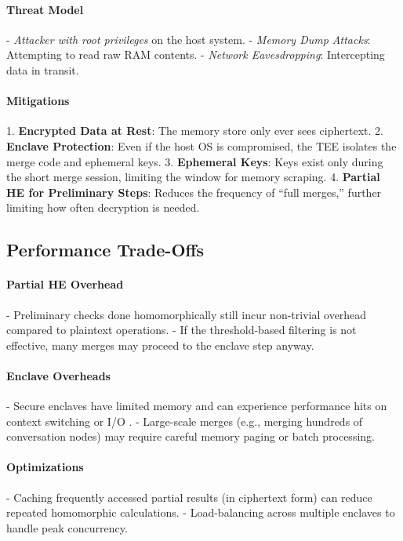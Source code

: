 \documentclass{article}
\begin{document}
\paragraph{Threat Model}
- \emph{Attacker with root privileges} on the host system.
- \emph{Memory Dump Attacks}: Attempting to read raw RAM contents.
- \emph{Network Eavesdropping}: Intercepting data in transit.

\paragraph{Mitigations}
1. \textbf{Encrypted Data at Rest}: The memory store only ever sees ciphertext.  
2. \textbf{Enclave Protection}: Even if the host OS is compromised, the TEE isolates the merge code and ephemeral keys.  
3. \textbf{Ephemeral Keys}: Keys exist only during the short merge session, limiting the window for memory scraping.  
4. \textbf{Partial HE for Preliminary Steps}: Reduces the frequency of “full merges,” further limiting how often decryption is needed.

\subsection{Performance Trade-Offs}

\paragraph{Partial HE Overhead}
- Preliminary checks done homomorphically still incur non-trivial overhead compared to plaintext operations.
- If the threshold-based filtering is not effective, many merges may proceed to the enclave step anyway.

\paragraph{Enclave Overheads}
- Secure enclaves have limited memory and can experience performance hits on context switching or I/O \citep{costan2016intel}.
- Large-scale merges (e.g., merging hundreds of conversation nodes) may require careful memory paging or batch processing.

\paragraph{Optimizations}
- Caching frequently accessed partial results (in ciphertext form) can reduce repeated homomorphic calculations.
- Load-balancing across multiple enclaves to handle peak concurrency.
\end{document}

